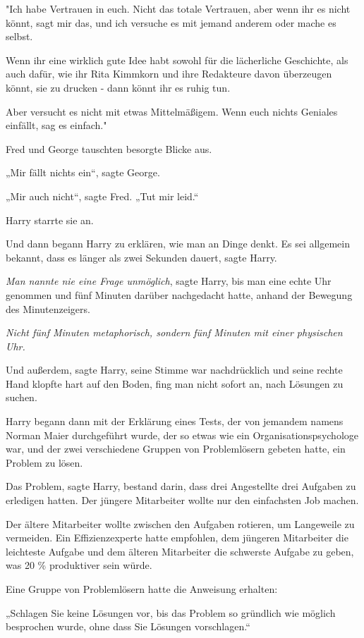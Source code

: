 {"Ich habe Vertrauen in euch. Nicht das totale Vertrauen, aber wenn ihr es nicht könnt, sagt mir das, und ich versuche es mit jemand anderem oder mache es selbst.

Wenn ihr eine wirklich gute Idee habt sowohl für die lächerliche Geschichte, als auch dafür, wie ihr Rita Kimmkorn und ihre Redakteure davon überzeugen könnt, sie zu drucken - dann könnt ihr es ruhig tun.

Aber versucht es nicht mit etwas Mittelmäßigem. Wenn euch nichts Geniales einfällt, sag es einfach."

Fred und George tauschten besorgte Blicke aus.

„Mir fällt nichts ein“, sagte George.

„Mir auch nicht“, sagte Fred. „Tut mir leid.“

Harry starrte sie an.

Und dann begann Harry zu erklären, wie man an Dinge denkt. Es sei allgemein bekannt, dass es länger als zwei Sekunden dauert, sagte Harry.

\emph{Man nannte nie eine Frage unmöglich}, sagte Harry, bis man eine echte Uhr genommen und fünf Minuten darüber nachgedacht hatte, anhand der Bewegung des Minutenzeigers.

\emph{Nicht fünf Minuten metaphorisch, sondern fünf Minuten mit einer physischen Uhr.}

Und außerdem, sagte Harry, seine Stimme war nachdrücklich und seine rechte Hand klopfte hart auf den Boden, fing man nicht sofort an, nach Lösungen zu suchen.

Harry begann dann mit der Erklärung eines Tests, der von jemandem namens Norman Maier durchgeführt wurde, der so etwas wie ein Organisationspsychologe war, und der zwei verschiedene Gruppen von Problemlösern gebeten hatte, ein Problem zu lösen.

Das Problem, sagte Harry, bestand darin, dass drei Angestellte drei Aufgaben zu erledigen hatten. Der jüngere Mitarbeiter wollte nur den einfachsten Job machen.

Der ältere Mitarbeiter wollte zwischen den Aufgaben rotieren, um Langeweile zu vermeiden. Ein Effizienzexperte hatte empfohlen, dem jüngeren Mitarbeiter die leichteste Aufgabe und dem älteren Mitarbeiter die schwerste Aufgabe zu geben, was 20 \% produktiver sein würde.

Eine Gruppe von Problemlösern hatte die Anweisung erhalten:

„Schlagen Sie keine Lösungen vor, bis das Problem so gründlich wie möglich besprochen wurde, ohne dass Sie Lösungen vorschlagen.“

}
